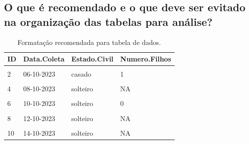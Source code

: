 \documentclass[
]{book}
\begin{document}
\hypertarget{o-que-uxe9-recomendado-e-o-que-deve-ser-evitado-na-organizauxe7uxe3o-das-tabelas-para-anuxe1lise}{%
\subsection{O que é recomendado e o que deve ser evitado na organização das tabelas para análise?}\label{o-que-uxe9-recomendado-e-o-que-deve-ser-evitado-na-organizauxe7uxe3o-das-tabelas-para-anuxe1lise}}

\begin{table}

\caption{\label{tab:tabela-recomendada}Formatação recomendada para tabela de dados.}
\centering
\begin{tabu} to 
\toprule
\textbf{ID} & \textbf{Data.Coleta} & \textbf{Estado.Civil} & \textbf{Numero.Filhos}\\
\midrule
{} &  &  & \\
2 & 06-10-2023 & casado & 1\\
 &  &  & \\
4 & 08-10-2023 & solteiro & NA\\
 &  &  & \\
6 & 10-10-2023 & solteiro & 0\\
 &  &  & \\
8 & 12-10-2023 & solteiro & NA\\
 &  &  & \\
10 & 14-10-2023 & solteiro & NA\\
\bottomrule
\end{tabu}
\end{table}
\end{document}

